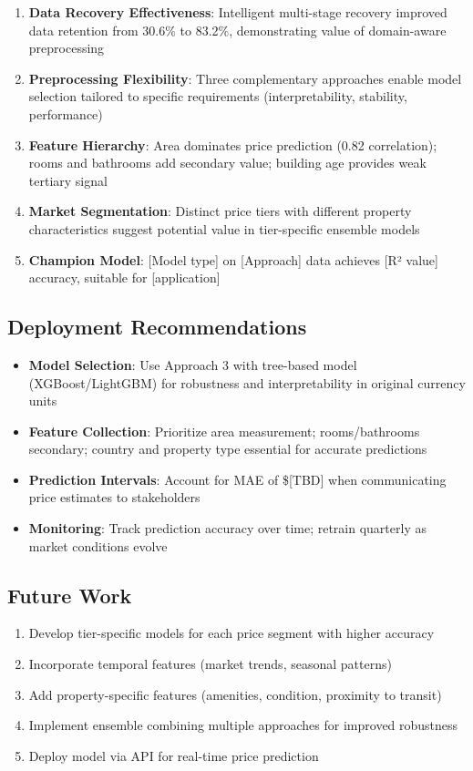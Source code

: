 \documentclass[12pt,a4paper]{article}
\begin{document}
\begin{enumerate}
    \item \textbf{Data Recovery Effectiveness}: Intelligent multi-stage recovery improved data retention from 30.6\% to 83.2\%, demonstrating value of domain-aware preprocessing
    \item \textbf{Preprocessing Flexibility}: Three complementary approaches enable model selection tailored to specific requirements (interpretability, stability, performance)
    \item \textbf{Feature Hierarchy}: Area dominates price prediction (0.82 correlation); rooms and bathrooms add secondary value; building age provides weak tertiary signal
    \item \textbf{Market Segmentation}: Distinct price tiers with different property characteristics suggest potential value in tier-specific ensemble models
    \item \textbf{Champion Model}: [Model type] on [Approach] data achieves [R² value] accuracy, suitable for [application]
\end{enumerate}

\subsection{Deployment Recommendations}

\begin{itemize}
    \item \textbf{Model Selection}: Use Approach 3 with tree-based model (XGBoost/LightGBM) for robustness and interpretability in original currency units
    \item \textbf{Feature Collection}: Prioritize area measurement; rooms/bathrooms secondary; country and property type essential for accurate predictions
    \item \textbf{Prediction Intervals}: Account for MAE of \$[TBD] when communicating price estimates to stakeholders
    \item \textbf{Monitoring}: Track prediction accuracy over time; retrain quarterly as market conditions evolve
\end{itemize}

\subsection{Future Work}

\begin{enumerate}
    \item Develop tier-specific models for each price segment with higher accuracy
    \item Incorporate temporal features (market trends, seasonal patterns)
    \item Add property-specific features (amenities, condition, proximity to transit)
    \item Implement ensemble combining multiple approaches for improved robustness
    \item Deploy model via API for real-time price prediction
\end{enumerate}
\end{document}

